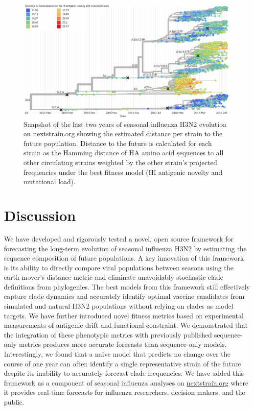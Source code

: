 \begin{figure}[htb]
  \begin{center}
  \includegraphics[width=\textwidth]{figures/nextstrain-weighted-distance-to-future-per-strain.png}
  \caption{
    Snapshot of the last two years of seasonal influenza H3N2 evolution on nextstrain.org showing the estimated distance per strain to the future population.
    Distance to the future is calculated for each strain as the Hamming distance of HA amino acid sequences to all other circulating strains weighted by the other strain's projected frequencies under the best fitness model (HI antigenic novelty and mutational load).
  }
  \label{fig:nextstrain_distance_to_future}
  \end{center}
\end{figure}

\section*{Discussion}

We have developed and rigorously tested a novel, open source framework for forecasting the long-term evolution of seasonal influenza H3N2 by estimating the sequence composition of future populations.
A key innovation of this framework is its ability to directly compare viral populations between seasons using the earth mover's distance metric \cite{Rubner1998} and eliminate unavoidably stochastic clade definitions from phylogenies.
The best models from this framework still effectively capture clade dynamics and accurately identify optimal vaccine candidates from simulated and natural H3N2 populations without relying on clades as model targets.
We have further introduced novel fitness metrics based on experimental measurements of antigenic drift and functional constraint.
We demonstrated that the integration of these phenotypic metrics with previously published sequence-only metrics produces more accurate forecasts than sequence-only models.
Interestingly, we found that a naive model that predicts no change over the course of one year can often identify a single representative strain of the future despite its inability to accurately forecast clade frequencies.
We have added this framework as a component of seasonal influenza analyses on \href{https://nextstrain.org/flu}{nextstrain.org} where it provides real-time forecasts for influenza researchers, decision makers, and the public.


